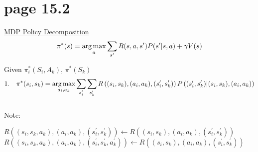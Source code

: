 \section*{page 15.2}

\underline{MDP Policy Decomposition}\\

\begin{equation*}
\pi^\ast(s) = \operatorname*{arg\,max}_{a} \sum_{s^\prime} R(s, a, s^\prime) P(s^\prime | s, a) +\gamma V(s)
\end{equation*}

Given $\pi^\ast_i(S_i,A_k)$, $\pi^\ast(S_k)$\\

\begin{equation*}
1.\quad \pi^\ast(s_i,s_k) = \operatorname*{arg\,max}_{a_i, a_k} \sum_{s^\prime_i} \sum_{s^\prime_k} R\left( (s_i,s_k),(a_i,a_k),(s^\prime_i,s^\prime_k)\right) P\left( (s^\prime_i, s^\prime_k) \middle| (s_i, s_k), (a_i, a_k)  \right)
\end{equation*}\\

Note:\qquad
\begin{minipage}[t]{10cm}
$R\left( (s_i,s_k,a_k),(a_i,a_k),(s^\prime_i,s^\prime_k) \right) \leftarrow R\left((s_i,s_k),(a_i,a_k),(s^\prime_i,s^\prime_k)\right)$\\
$R\left( (s_i,s_k,a_k),(a_i,a_k),(s^\prime_i,s^\prime_k,a^\prime_k) \right) \leftarrow R\left((s_i,s_k),(a_i,a_k),(s^\prime_i,s^\prime_k)\right)$
\end{minipage}\\


